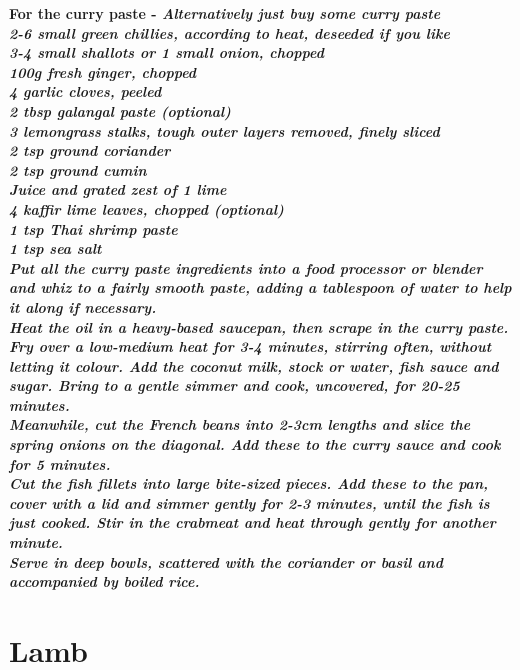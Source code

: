 \documentclass[18pt, oneside]{book}
\begin{document}
\bf{For the curry paste} - \it{Alternatively just buy some curry paste} \normalfont \\
2-6 small green chillies, according to heat, deseeded if you like \\
3-4 small shallots or 1 small onion, chopped \\
100g fresh ginger, chopped \\
4 garlic cloves, peeled \\
2 tbsp galangal paste (optional) \\
3 lemongrass stalks, tough outer layers removed, finely sliced \\
2 tsp ground coriander \\
2 tsp ground cumin \\
Juice and grated zest of 1 lime \\
4 kaffir lime leaves, chopped (optional) \\
1 tsp Thai shrimp paste \\
1 tsp sea salt \\

Put all the curry paste ingredients into a food processor or blender and whiz to a fairly smooth paste, adding a tablespoon of water to help it along if necessary. \\

Heat the oil in a heavy-based saucepan, then scrape in the curry paste. Fry over a low-medium heat for 3-4 minutes, stirring often, without letting it colour. Add the coconut milk, stock or water, fish sauce and sugar. Bring to a gentle simmer and cook, uncovered, for 20-25 minutes. \\

Meanwhile, cut the French beans into 2-3cm lengths and slice the spring onions on the diagonal. Add these to the curry sauce and cook for 5 minutes. \\

Cut the fish fillets into large bite-sized pieces. Add these to the pan, cover with a lid and simmer gently for 2-3 minutes, until the fish is just cooked. Stir in the crabmeat and heat through gently for another minute. \\

Serve in deep bowls, scattered with the coriander or basil and accompanied by boiled rice. \\

\chapter{Lamb}
\end{document}
